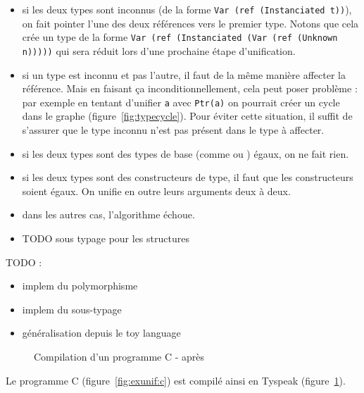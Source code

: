 \begin{itemize}

\item si les deux types sont inconnus (de la forme \texttt{Var (ref
(Instanciated t))}), on fait pointer l'une des deux références vers le premier
type. Notons que cela crée un type de la forme \texttt{Var (ref (Instanciated
(Var (ref (Unknown n)))))} qui sera réduit lors d'une prochaine étape
d'unification.

\item si un type est inconnu et pas l'autre, il faut de la même manière affecter la
référence. Mais en faisant ça inconditionnellement, cela peut poser problème :
par exemple en tentant d'unifier \texttt{a} avec \texttt{Ptr(a)} on pourrait
créer un cycle dans le graphe (figure~\ref{fig:typecycle}).
Pour éviter cette situation, il suffit de s'assurer que le type inconnu n'est
pas présent dans le type à affecter.

\item si les deux types sont des types de base (comme \tInt ou \tFloat) égaux,
on ne fait rien.

\item si les deux types sont des constructeurs de type, il faut que les
constructeurs soient égaux. On unifie en outre leurs arguments deux à deux.

\item dans les autres cas, l'algorithme échoue.

\item TODO sous typage pour les structures

\end{itemize}


TODO :

\begin{itemize}
\item implem du polymorphisme
\item implem du sous-typage
\item généralisation depuis le toy language
\end{itemize}

\clearpage

\begin{figure} %


  \caption{Compilation d'un programme C - après}
  \label{fig:exunif:tpk}
\end{figure} %

Le programme C (figure~\ref{fig:exunif:c}) est compilé ainsi en Tyspeak
(figure~\ref{fig:exunif:tpk}).

